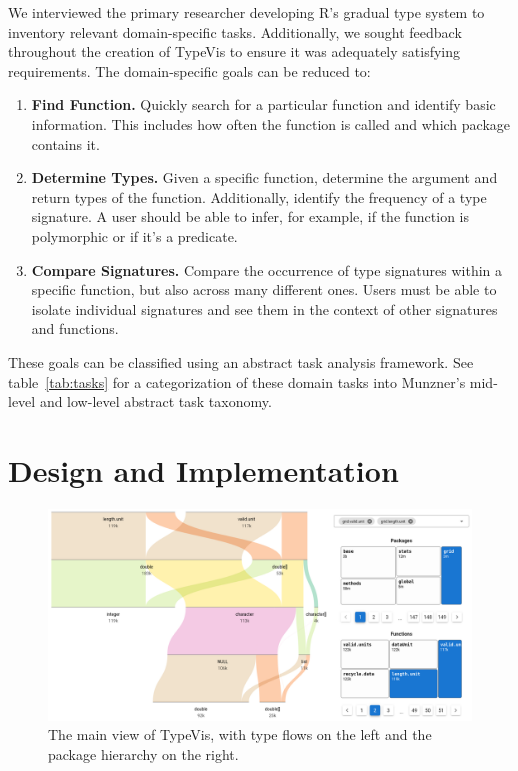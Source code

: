 \documentclass{vgtc}                          %
\begin{document}
We interviewed the primary researcher developing R's gradual type system
to inventory relevant domain-specific tasks.
Additionally, we sought feedback throughout the creation of {\sc TypeVis}
to ensure it was adequately satisfying requirements.
The domain-specific goals can be reduced to:

\begin{enumerate}
\item {\bf Find Function.} Quickly search for a particular function and identify basic information. This includes how often the function is called and which package contains it.
\item {\bf Determine Types.} Given a specific function, determine the argument and return types of the function. Additionally, identify the frequency of a type signature. A user should be able to infer, for example, if the function is polymorphic or if it's a predicate.
\item {\bf Compare Signatures.} Compare the occurrence of type signatures within a specific function, but also across many different ones. Users must be able to isolate individual signatures and see them in the context of other signatures and functions.
\end{enumerate}

These goals can be classified using an abstract task analysis framework.
See table~\ref{tab:tasks} for a categorization of these domain tasks
into Munzner's mid-level and low-level abstract task taxonomy. 


\section{Design and Implementation}

\begin{figure}
 \centering
 \includegraphics[width=\linewidth]{img/typevis.png}
 \caption{The main view of {\sc TypeVis}, with type flows on the left and the package hierarchy on the right.}
 \label{fig:typevis}
\end{figure}
\end{document}
